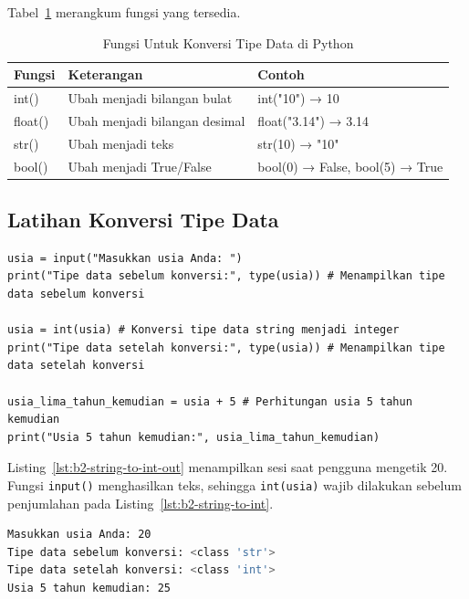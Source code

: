 Tabel~\ref{tab:b2-konversi} merangkum fungsi yang tersedia.

\begin{table}[H]
  \centering
  \caption{Fungsi Untuk Konversi Tipe Data di Python}
  \label{tab:b2-konversi}
  \begin{tabularx}{\textwidth}{lXX}
    \hline
    \textbf{Fungsi} & \textbf{Keterangan} & \textbf{Contoh} \\
    \hline
    int() & Ubah menjadi bilangan bulat & int("10") → 10 \\
    \hline
    float() & Ubah menjadi bilangan desimal & float("3.14") → 3.14 \\
    \hline
    str() & Ubah menjadi teks & str(10) → "10" \\
    \hline
    bool() & Ubah menjadi True/False & bool(0) → False, bool(5) → True \\
    \hline
  \end{tabularx}
\end{table}

\subsection{Latihan Konversi Tipe Data}

\begin{lstlisting}[style=PythonStyle, caption={Kode Python: string_to_int.py}, label={lst:b2-string-to-int}]
usia = input("Masukkan usia Anda: ")
print("Tipe data sebelum konversi:", type(usia)) # Menampilkan tipe data sebelum konversi

usia = int(usia) # Konversi tipe data string menjadi integer
print("Tipe data setelah konversi:", type(usia)) # Menampilkan tipe data setelah konversi

usia_lima_tahun_kemudian = usia + 5 # Perhitungan usia 5 tahun kemudian
print("Usia 5 tahun kemudian:", usia_lima_tahun_kemudian)
\end{lstlisting}

Listing~\ref{lst:b2-string-to-int-out} menampilkan sesi saat pengguna mengetik 20. Fungsi \texttt{input()} menghasilkan teks, sehingga \texttt{int(usia)} wajib dilakukan sebelum penjumlahan pada Listing~\ref{lst:b2-string-to-int}.

\begin{lstlisting}[language=bash, caption={Keluaran string_to_int.py}, label={lst:b2-string-to-int-out}]
Masukkan usia Anda: 20
Tipe data sebelum konversi: <class 'str'>
Tipe data setelah konversi: <class 'int'>
Usia 5 tahun kemudian: 25
\end{lstlisting}



